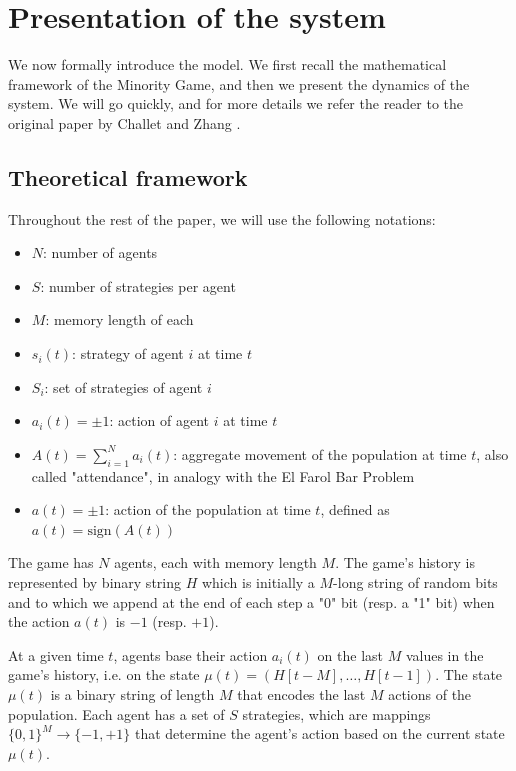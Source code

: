 \documentclass[a4paper, amsfonts, amssymb, amsmath, reprint, showkeys, nofootinbib, twoside]{revtex4-1}
\begin{document}
\section{Presentation of the system}
\label{sec:presentation}

We now formally introduce the model. We first recall the mathematical framework of the Minority Game, and then we present the dynamics of the system. We will go quickly, and for more details we refer the reader to the original paper by Challet and Zhang \cite{Challet_1997}.

\subsection{Theoretical framework}

Throughout the rest of the paper, we will use the following notations:
\begin{itemize}
    \item $N$: number of agents
    \item $S$: number of strategies per agent
    \item $M$: memory length of each
    \item $s_i(t)$: strategy of agent $i$ at time $t$
    \item $S_i$: set of strategies of agent $i$
    \item $a_i(t) = \pm 1$: action of agent $i$ at time $t$
    \item $A(t) = \sum_{i=1}^N a_i(t)$: aggregate movement of the population at time $t$, also called "attendance", in analogy with the El Farol Bar Problem
    \item $a(t) = \pm 1$: action of the population at time $t$, defined as $a(t) = \text{sign}(A(t))$
\end{itemize}

The game has $N$ agents, each with memory length $M$. The game's history is represented by binary string $H$ which is initially a $M$-long string of random bits and to which we append at the end of each step a "0" bit (resp. a "1" bit) when the action $a(t)$ is $-1$ (resp. $+1$).

At a given time $t$, agents base their action $a_i(t)$ on the last $M$ values in the game's history, i.e. on the state $\mu(t) = (H[t-M], \ldots, H[t-1])$. The state $\mu(t)$ is a binary string of length $M$ that encodes the last $M$ actions of the population. Each agent has a set of $S$ strategies, which are mappings $\{0, 1\}^M \to \{-1, +1\}$ that determine the agent's action based on the current state $\mu(t)$.
\end{document}
